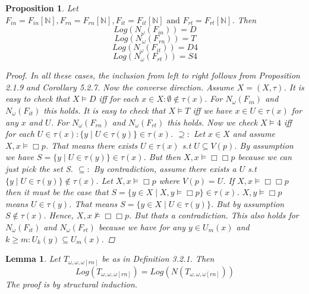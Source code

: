 \documentclass[12pt, a4paper]{scrartcl}
\newtheorem{lemma}[definition]{Lemma}
\newtheorem{proposition}[definition]{Proposition}
\begin{document}
\begin{proposition}
    Let $F_{in} = F_{in}[\mathbb{N}], F_{rn} = F_{rn}[\mathbb{N}], F_{it} = F_{it}[\mathbb{N}] \mbox{ and } F_{rt} = F_{rt}[\mathbb{N}]$. Then
    $$Log(N_\omega(F_{in})) = D$$
    $$Log(N_\omega(F_{rn})) = T$$
    $$Log(N_\omega(F_{it})) = D4$$
    $$Log(N_\omega(F_{rt})) = S4$$

    \begin{proof}
        In all these cases, the inclusion from left to right follows from Proposition 2.1.9 and Corollary 5.2.7.
        Now the converse direction. Assume $X =(X,\tau)$. \newline
        It is easy to check that $X \vDash D$ iff for each $x \in X : \emptyset \notin \tau(x)$. For $N_\omega(F_{in})$ and $N_\omega(F_{it})$ this holds. \newline
        It is easy to check that $X \vDash T$ iff we have $x\in U \in \tau(x)$ for any $x$ and $U$. For $N_\omega(F_{rn})$ and $N_\omega(F_{rt})$ this holds. \newline
        Now we check $X \vDash 4$ iff for each $U \in \tau(x) : \{y \mid U \in \tau(y)\} \in \tau(x)$. \newline
        $\supseteq : $ Let $x \in X$ and assume $X,x \vDash \Box p$. That means there exists $U \in \tau(x)$ s.t $U\subseteq V(p)$.
        By assumption we have $S = \{y \mid U \in \tau(y)\} \in \tau(x)$. But then $X,x \vDash \Box\Box p$ because we can just pick the set S. \newline
        $\subseteq :$ By contradiction, assume there exists a $U$ s.t $\{y \mid U \in \tau(y)\} \notin \tau(x)$. Let $X,x \vDash \Box p$ where $V(p) = U$.
        If $X,x \vDash \Box\Box p$ then it must be the case that  \newline 
        $S =\{y \in X \mid X,y \vDash \Box p\} \in \tau(x)$. $X,y \vDash \Box p$ means $U \in \tau(y)$. That means $S = \{y \in X \mid U \in \tau(y)\}$. But by assumption $S \notin \tau(x)$. 
        Hence, $X,x \not\vDash \Box\Box p$. But thats a contradiction. This also holds for $N_\omega(F_{it})$ and $N_\omega(F_{rt})$ because we have for any $y \in U_m(x)$ and 
        $k \geq m : U_k(y) \subseteq U_m(x)$.
            
    \end{proof}
\end{proposition}

\begin{lemma}
    Let $T_{\omega,\omega,\omega[rn]}$ be as in Definition 3.2.1. Then 
    $$Log(T_{\omega,\omega,\omega[rn]}) = Log(N(T_{\omega,\omega,\omega[rn]}))$$ \newline
    The proof is by structural induction.

    
\end{lemma}
\end{document}
